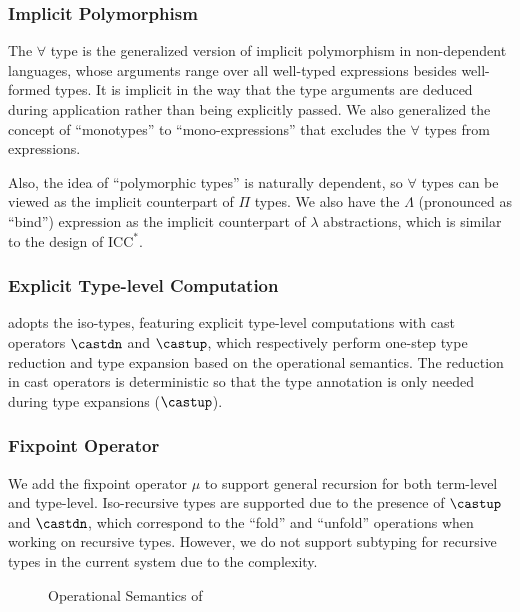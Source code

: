 \subsubsection{Implicit Polymorphism}

The $\forall$ type is the generalized version of implicit polymorphism in
non-dependent languages, whose arguments range over all well-typed expressions
besides well-formed types. It is implicit in the way that the type arguments are
deduced during application rather than being explicitly passed.
We also generalized the concept of ``monotypes'' to
``mono-expressions'' that excludes the $\forall$ types from expressions.

Also, the idea of ``polymorphic types'' is naturally dependent, so $\forall$
types can be viewed as the implicit counterpart of $\Pi$ types. We also have
the $\Lambda$ (pronounced as ``bind'') expression as the implicit counterpart of
$\lambda$ abstractions, which is similar to the design of $\text{ICC}^*$\cite{barras2008implicit}.

\subsubsection{Explicit Type-level Computation}
\label{sec:cast}

\System adopts the iso-types\cite{yang2016unified}, featuring explicit type-level
computations with cast operators $\castdn$ and $\castup$, which respectively perform one-step
type reduction and type expansion based on the operational semantics.
The reduction in cast operators is deterministic so that the type annotation is
only needed during type expansions ($\castup$).

\subsubsection{Fixpoint Operator}

We add the fixpoint operator $\mu$ to support general recursion for both term-level
and type-level. Iso-recursive types are supported due to the presence of $\castup$
and $\castdn$, which correspond to the ``fold'' and ``unfold'' operations when
working on recursive types. However, we do not support subtyping for recursive
types in the current system due to the complexity.

\begin{figure}
    \centering


    \caption{Operational Semantics of \system}
    \label{fig:semantics}
\end{figure}

